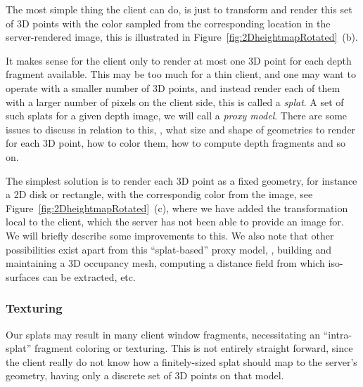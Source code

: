 The most simple thing the client can do, is just to transform and render this
set of 3D points with the color sampled from the corresponding location in the
server-rendered image, this is illustrated in
Figure~\ref{fig:2DheightmapRotated}~(b).

It makes sense for the client only to render at most one 3D point for each depth
fragment available. This may be too much for a thin client, and one may want to
operate with a smaller number of 3D points, and instead render each of them with
a larger number of pixels on the client side, this is called a {\em
splat}. A set of such splats for a given depth image, we will call a {\em proxy
model}. There are some issues to discuss in relation to this, \eg, what size and
shape of geometries to render for each 3D point, how to color them, how to
compute depth fragments and so on.

The simplest solution is to render each 3D point as a fixed geometry, for
instance a 2D disk or rectangle, with the correspondig color from the image, see
Figure~\ref{fig:2DheightmapRotated}~(c), where we have added the transformation
local to the client, which the server has not been able to provide an image for.
We will briefly describe some improvements to this. We also note that other
possibilities exist apart from this ``splat-based'' proxy model, \eg, building
and maintaining a 3D occupancy mesh, computing a distance field from which
iso-surfaces can be extracted, etc.


\subsubsection{Texturing}

Our splats may result in many client window fragments, necessitating an
``intra-splat'' fragment coloring or texturing. This is not entirely straight
forward, since the client really do not know how a finitely-sized splat should
map to the server's geometry, having only a discrete set of 3D points on that
model.

